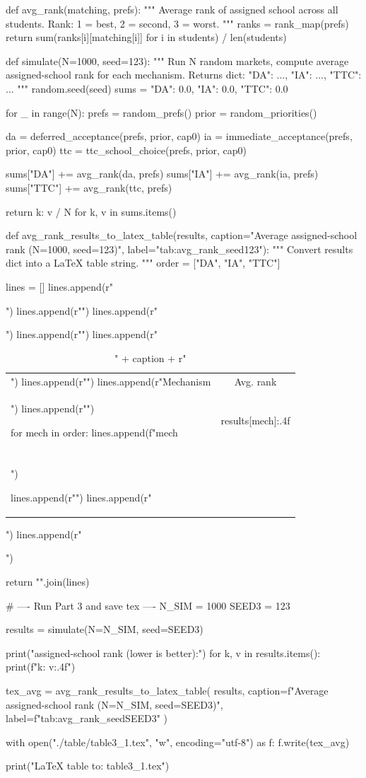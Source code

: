 

def avg_rank(matching, prefs):
    """
    Average rank of assigned school across all students.
    Rank: 1 = best, 2 = second, 3 = worst.
    """
    ranks = rank_map(prefs)
    return sum(ranks[i][matching[i]] for i in students) / len(students)

def simulate(N=1000, seed=123):
    """
    Run N random markets, compute average assigned-school rank for each mechanism.
    Returns dict: {"DA": ..., "IA": ..., "TTC": ...}
    """
    random.seed(seed)
    sums = {"DA": 0.0, "IA": 0.0, "TTC": 0.0}

    for _ in range(N):
        prefs = random_prefs()
        prior = random_priorities()

        da  = deferred_acceptance(prefs, prior, cap0)
        ia  = immediate_acceptance(prefs, prior, cap0)
        ttc = ttc_school_choice(prefs, prior, cap0)

        sums["DA"]  += avg_rank(da, prefs)
        sums["IA"]  += avg_rank(ia, prefs)
        sums["TTC"] += avg_rank(ttc, prefs)

    return {k: v / N for k, v in sums.items()}

def avg_rank_results_to_latex_table(results,
                                   caption="Average assigned-school rank (N=1000, seed=123)",
                                   label="tab:avg_rank_seed123"):
    """
    Convert results dict into a LaTeX table string.
    """
    order = ["DA", "IA", "TTC"]

    lines = []
    lines.append(r"\begin{table}[!htbp]")
    lines.append(r"\centering")
    lines.append(r"\caption{" + caption + r"}")
    lines.append(r"\label{" + label + r"}")
    lines.append(r"\begin{tabular}{lc}")
    lines.append(r"\hline")
    lines.append(r"Mechanism & Avg. rank \\")
    lines.append(r"\hline")

    for mech in order:
        lines.append(f"{mech} & {results[mech]:.4f} \\\\")

    lines.append(r"\hline")
    lines.append(r"\end{tabular}")
    lines.append(r"\end{table}")

    return "\n".join(lines)

# ---- Run Part 3 and save tex ----
N_SIM = 1000
SEED3 = 123

results = simulate(N=N_SIM, seed=SEED3)

print("\nAverage assigned-school rank (lower is better):")
for k, v in results.items():
    print(f"{k}: {v:.4f}")

tex_avg = avg_rank_results_to_latex_table(
    results,
    caption=f"Average assigned-school rank (N={N_SIM}, seed={SEED3})",
    label=f"tab:avg_rank_seed{SEED3}"
)

with open("./table/table3_1.tex", "w", encoding="utf-8") as f:
    f.write(tex_avg)

print("\nSaved LaTeX table to: table3_1.tex")